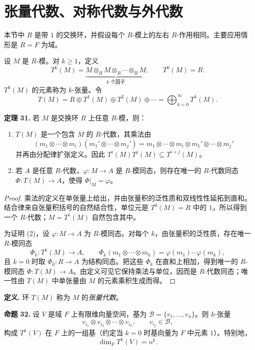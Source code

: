 \section{张量代数、对称代数与外代数}

本节中 $R$ 是带 $1$ 的交换环，并假设每个 $R$-模上的左右 $R$-作用相同。主要应用情形是 $R=F$ 为域。

设 $M$ 是 $R$-模。对 $k\geq1$，定义
\[
T^k(M)=\underbrace{M\otimes_R M\otimes_R\cdots\otimes_R M}_{k\text{ 个因子}},
\qquad
T^0(M)=R.
\]
$T^k(M)$ 的元素称为 $k$-张量。令
\[
T(M)=R\oplus T^1(M)\oplus T^2(M)\oplus\cdots
=\bigoplus_{k=0}^{\infty}T^k(M).
\]

\noindent\textbf{定理 31.} 若 $M$ 是交换环 $R$ 上任意 $R$-模，则：
\begin{enumerate}[label=(\arabic*)]
\item $T(M)$ 是一个包含 $M$ 的 $R$-代数，其乘法由
\[
(m_1\otimes\cdots\otimes m_i)(m_1'\otimes\cdots\otimes m_j')
=m_1\otimes\cdots\otimes m_i\otimes m_1'\otimes\cdots\otimes m_j'
\]
并再由分配律扩张定义。因此 $T^i(M)T^j(M)\subseteq T^{i+j}(M)$。
\item 若 $A$ 是任意 $R$-代数，$\varphi:M\to A$ 是 $R$-模同态，则存在唯一的 $R$-代数同态 $\Phi:T(M)\to A$，使得 $\Phi|_M=\varphi$。
\end{enumerate}

\begin{proof}
乘法的定义在单张量上给出，并由张量积的泛性质和双线性性延拓到直和。结合律来自张量积括号的自然结合性，单位元是 $T^0(M)=R$ 中的 $1$，所以得到一个 $R$-代数；$M=T^1(M)$ 自然包含其中。

为证明 (2)，设 $\varphi:M\to A$ 为 $R$-模同态。对每个 $k$，由张量积的泛性质，存在唯一 $R$-模同态
\[
\Phi_k:T^k(M)\to A,
\qquad
\Phi_k(m_1\otimes\cdots\otimes m_k)=\varphi(m_1)\cdots\varphi(m_k),
\]
且 $k=0$ 时取 $\Phi_0:R\to A$ 为结构同态。把这些 $\Phi_k$ 在直和上相加，得到唯一的 $R$-模同态 $\Phi:T(M)\to A$。由定义可见它保持乘法与单位，因而是 $R$-代数同态；唯一性由 $T(M)$ 中单张量由 $M$ 的元素乘积生成而得。
\end{proof}

\noindent\textbf{定义.} 环 $T(M)$ 称为 $M$ 的\emph{张量代数}。

\noindent\textbf{命题 32.} 设 $V$ 是域 $F$ 上有限维向量空间，基为 $\mathcal B=\{v_1,\ldots,v_n\}$。则 $k$-张量
\[
v_{i_1}\otimes v_{i_2}\otimes\cdots\otimes v_{i_k},
\qquad v_{i_j}\in\mathcal B,
\]
构成 $T^k(V)$ 在 $F$ 上的一组基（约定当 $k=0$ 时基向量为 $F$ 中元素 $1$）。特别地，
\[
\dim_F T^k(V)=n^k.
\]

